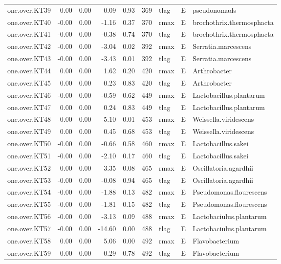 \begin{table}[ht]
\begin{tabular}{rrrrrrlll}
  one.over.KT39 & -0.00 & 0.00 & -0.09 & 0.93 & 369 & tlag & E & pseudonomads \\ 
  one.over.KT40 & -0.00 & 0.00 & -1.16 & 0.37 & 370 & rmax & E & brochothrix.thermosphacta \\ 
  one.over.KT41 & -0.00 & 0.00 & -0.38 & 0.74 & 370 & tlag & E & brochothrix.thermosphacta \\ 
  one.over.KT42 & -0.00 & 0.00 & -3.04 & 0.02 & 392 & rmax & E & Serratia.marcescens \\ 
  one.over.KT43 & -0.00 & 0.00 & -3.43 & 0.01 & 392 & tlag & E & Serratia.marcescens \\ 
  one.over.KT44 & 0.00 & 0.00 & 1.62 & 0.20 & 420 & rmax & E & Arthrobacter \\ 
  one.over.KT45 & 0.00 & 0.00 & 0.23 & 0.83 & 420 & tlag & E & Arthrobacter \\ 
  one.over.KT46 & -0.00 & 0.00 & -0.59 & 0.62 & 449 & rmax & E & Lactobacillus.plantarum \\ 
  one.over.KT47 & 0.00 & 0.00 & 0.24 & 0.83 & 449 & tlag & E & Lactobacillus.plantarum \\ 
  one.over.KT48 & -0.00 & 0.00 & -5.10 & 0.01 & 453 & rmax & E & Weissella.viridescens \\ 
  one.over.KT49 & 0.00 & 0.00 & 0.45 & 0.68 & 453 & tlag & E & Weissella.viridescens \\ 
  one.over.KT50 & -0.00 & 0.00 & -0.66 & 0.58 & 460 & rmax & E & Lactobacillus.sakei \\ 
  one.over.KT51 & -0.00 & 0.00 & -2.10 & 0.17 & 460 & tlag & E & Lactobacillus.sakei \\ 
  one.over.KT52 & 0.00 & 0.00 & 3.35 & 0.08 & 465 & rmax & E & Oscillatoria.agardhii \\ 
  one.over.KT53 & -0.00 & 0.00 & -0.08 & 0.94 & 465 & tlag & E & Oscillatoria.agardhii \\ 
  one.over.KT54 & -0.00 & 0.00 & -1.88 & 0.13 & 482 & rmax & E & Pseudomonas.flourescens \\ 
  one.over.KT55 & -0.00 & 0.00 & -1.81 & 0.15 & 482 & tlag & E & Pseudomonas.flourescens \\ 
  one.over.KT56 & -0.00 & 0.00 & -3.13 & 0.09 & 488 & rmax & E & Lactobaciulus.plantarum \\ 
  one.over.KT57 & -0.00 & 0.00 & -14.60 & 0.00 & 488 & tlag & E & Lactobaciulus.plantarum \\ 
  one.over.KT58 & 0.00 & 0.00 & 5.06 & 0.00 & 492 & rmax & E & Flavobacterium \\ 
  one.over.KT59 & 0.00 & 0.00 & 0.29 & 0.78 & 492 & tlag & E & Flavobacterium \\ 

\end{tabular}
\end{table}
